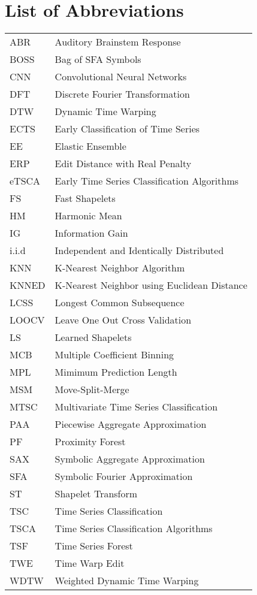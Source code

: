 \section*{List of Abbreviations}


\begin{table}[h!]
\begin{tabular}{ll}
ABR   & Auditory Brainstem Response\\
BOSS   & Bag of SFA Symbols\\
CNN   & Convolutional Neural Networks\\
DFT   & Discrete Fourier Transformation\\
DTW   & Dynamic Time Warping\\
ECTS   & Early Classification of Time Series\\
EE   & Elastic Ensemble\\
ERP   & Edit Distance with Real Penalty\\
eTSCA   & Early Time Series Classification Algorithms\\
FS   & Fast Shapelets\\
HM   & Harmonic Mean\\
IG   & Information Gain\\
i.i.d   & Independent and Identically Distributed\\
KNN   & K-Nearest Neighbor Algorithm\\
KNNED   & K-Nearest Neighbor using Euclidean Distance\\
LCSS   & Longest Common Subsequence\\
LOOCV   & Leave One Out Cross Validation\\
LS   & Learned Shapelets\\
MCB   & Multiple Coefficient Binning\\
MPL   & Mimimum Prediction Length\\
MSM   & Move-Split-Merge\\
MTSC   & Multivariate Time Series Classification\\
PAA   & Piecewise Aggregate Approximation\\
PF   & Proximity Forest\\
SAX   & Symbolic Aggregate Approximation\\
SFA   & Symbolic Fourier Approximation\\
ST   & Shapelet Transform\\
TSC   & Time Series Classification\\
TSCA   & Time Series Classification Algorithms\\
TSF   & Time Series Forest\\
TWE   & Time Warp Edit\\
WDTW   & Weighted Dynamic Time Warping
\end{tabular}
\end{table}

\null\newpage
